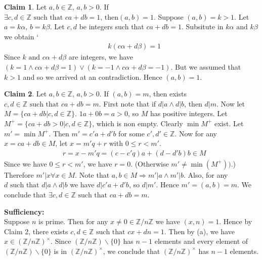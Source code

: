 \documentclass[A4paper,12pt]{article}
\theoremstyle{definition}
\newtheorem{claim}{Claim}
\numberwithin{equation}{section}
\begin{document}
\begin{enumerate}[1)]
\begin{enumerate}[(a)]
\begin{claim}
                    Let $a, b \in \mathbb{Z},\, a,b>0$. If $\exists c,d\in \mathbb{Z} \text{ such that } ca+db=1,\, \text{then} (a,b)=1.$
                    \proof
                    Suppose $(a, b) = k>1$. Let $a = k\alpha,\, b = k\beta$. Let $c, d$ be integers such that $ca+db=1$. Subsitute in $k\alpha \text{ and } k\beta$ we obtain
            `        
                    \begin{align*}
                        &k(c\alpha+d\beta) = 1
                    \end{align*}
                    Since $k \text{ and }c\alpha+d\beta$ are integers, we have $(k=1 \land c\alpha+d\beta = 1) \lor (k = -1 \land c\alpha+d\beta = -1)$. But we assumed that $k>1$ and so we arrived at an contradiction.
                    Hence $(a,b) = 1$.
                \end{claim}
                \begin{claim}
                    Let $a, b \in \mathbb{Z},\, a,b>0$. If $(a,b)=m$, then exists $c, d \in \mathbb{Z} \text{ such that } ca+db = m$.
                    \proof
                    First note that if $d|a \land d|b$, then $d|m$. Now let $M = \{ca+db|c, d \in \mathbb{Z}\}$. $1a+0b = a > 0$, so $M$ has positive integers. Let $M^{+} = \{ca+db>0|c, d \in \mathbb{Z}\}$, which is non empty. Clearly $\min{M^{+}}$ exist. Let $m' = \min{M^{+}}$. Then $m' = c'a+d'b$ for some $c', d' \in \mathbb{Z}$. Now for any $x = ca+db \in M$, let $x = m'q+r$ with $0 \leq r <m'$.
                \begin{align*}
                    &r = x-m'q = (c-c'q)a + (d-d'b)b \in M
                \end{align*}
                Since we have $0 \leq r < m'$, we have $r=0$. (Otherwise $m' \neq \min(M^{+}))$.)
                Therefore $m'|x \forall x \in M$. Note that $a, b\in M \Rightarrow m'|a \land m'|b$. Also, for any $d \text{ such that } d|a \land d|b$ we have $d|c'a+d'b$, so $d|m'$. Hence $m' = (a,b) = m$.
                We conclude that $\exists c, d \in \mathbb{Z} \text{ such that } ca+db = m$.
                \end{claim}
                \textbf{Sufficiency:}\\
                Suppose $n$ is prime. 
                Then for any $x \neq 0 \in \mathbb{Z}/n\mathbb{Z}$ we have $(x,n) = 1$. 
                Hence by Claim 2, there exists $c, d \in \mathbb{Z} \text{ such that } cx+dn=1$. 
                Then by (a), we have $x \in (\mathbb{Z}/n\mathbb{Z})^{\times}$. 
                Since $(\mathbb{Z}/n\mathbb{Z})\backslash \{0\}$ has $n-1$ elements and every element of $(\mathbb{Z}/n\mathbb{Z})\backslash\{0\}$ is in $(\mathbb{Z}/n\mathbb{Z})^{\times}$, we conclude that $(\mathbb{Z}/n\mathbb{Z})^{\times}$ has $n-1$ elements.

\end{enumerate}
\end{enumerate}
\end{document}
